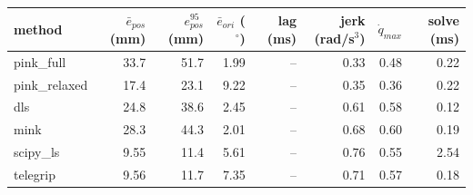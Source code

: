 \begin{tabular}{lrrrrrrr}
\toprule
method & $\bar{e}_{pos}$ (mm) & $e_{pos}^{95}$ (mm) & $\bar{e}_{ori}$ ($^\circ$) & lag (ms) & jerk (rad/s$^3$) & $\dot{q}_{max}$ & solve (ms) \\
\midrule
pink\_full & 33.7 & 51.7 & 1.99 & -- & 0.33 & 0.48 & 0.22 \\
pink\_relaxed & 17.4 & 23.1 & 9.22 & -- & 0.35 & 0.36 & 0.22 \\
dls & 24.8 & 38.6 & 2.45 & -- & 0.61 & 0.58 & 0.12 \\
mink & 28.3 & 44.3 & 2.01 & -- & 0.68 & 0.60 & 0.19 \\
scipy\_ls & 9.55 & 11.4 & 5.61 & -- & 0.76 & 0.55 & 2.54 \\
telegrip & 9.56 & 11.7 & 7.35 & -- & 0.71 & 0.57 & 0.18 \\
\bottomrule
\end{tabular}
